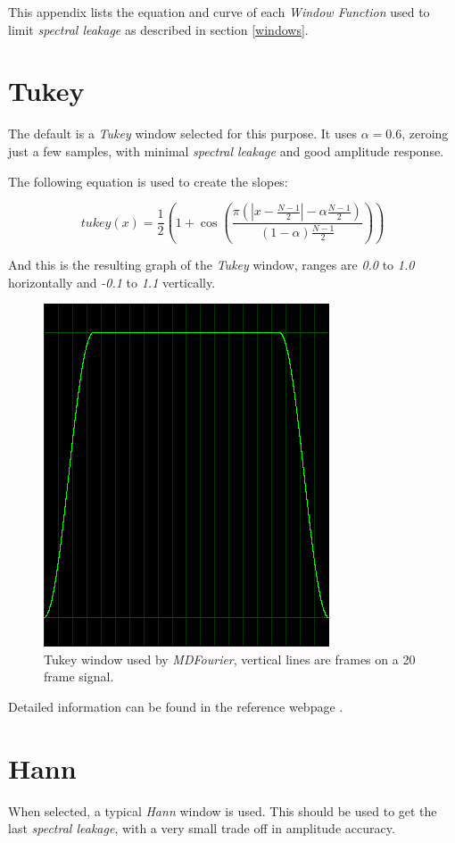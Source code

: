 \documentclass[10pt,a4paper]{report}
\begin{document}
\begin{appendices}
This appendix lists the equation and curve of each \textit{Window Function} used to limit \textit{spectral leakage} as described in section \ref{windows}.

\section{Tukey}

The default is a \textit{Tukey} window selected for this purpose. It uses $\alpha = 0.6$, zeroing just a few samples, with minimal \textit{spectral leakage} and good amplitude response.

The following equation is used to create the slopes:

\begin{equation}
tukey(x)=\frac{1}{2}(1+\cos(\frac{\pi(|x-\frac{N-1}{2}|-\alpha \frac{N-1}{2})}{(1-\alpha)\frac{N-1}{2}}))
\end{equation}

And this is the resulting graph of the \textit{Tukey} window, ranges are \textit{0.0} to \textit{1.0} horizontally and \textit{-0.1} to \textit{1.1} vertically.

\begin{figure}[H]
	\centering
	\includegraphics[width=0.4\linewidth]{images/windows/window-tukey.png}
	\caption[Tukey Window]{Tukey window used by \textit{MDFourier}, vertical lines are frames on a 20 frame signal.}
	\label{fig:window-tukey}
\end{figure}

Detailed information can be found in the reference webpage \cite{tukey}.

\section{Hann}
When selected, a typical \textit{Hann} window is used. This should be used to get the last \textit{spectral leakage}, with a very small trade off in amplitude accuracy.


\end{appendices}
\end{document}
